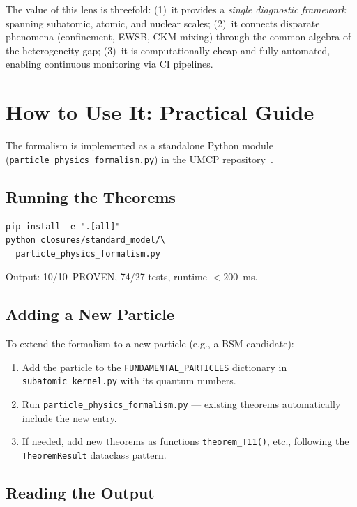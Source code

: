 \documentclass[
  aps,
  prd,
  twocolumn,
  superscriptaddress,
  nofootinbib,
  floatfix
]{revtex4-2}
\begin{document}
The value of this lens is threefold:
(1)~it provides a \emph{single diagnostic framework} spanning
subatomic, atomic, and nuclear scales;
(2)~it connects disparate phenomena (confinement, EWSB, CKM mixing)
through the common algebra of the heterogeneity gap;
(3)~it is computationally cheap and fully automated, enabling
continuous monitoring via CI pipelines.

\section{How to Use It: Practical Guide}\label{sec:howto}

The formalism is implemented as a standalone Python module
(\texttt{particle\_physics\_formalism.py}) in the UMCP
repository~\cite{umcpmetadatarepo}.

\subsection{Running the Theorems}

\begin{verbatim}
pip install -e ".[all]"
python closures/standard_model/\
  particle_physics_formalism.py
\end{verbatim}

Output: 10/10~PROVEN, 74/27 tests, runtime $< 200$~ms.

\subsection{Adding a New Particle}

To extend the formalism to a new particle (e.g., a BSM candidate):

\begin{enumerate}
\item Add the particle to the \texttt{FUNDAMENTAL\_PARTICLES}
  dictionary in \texttt{subatomic\_kernel.py} with its
  quantum numbers.
\item Run \texttt{particle\_physics\_formalism.py} ---
  existing theorems automatically include the new entry.
\item If needed, add new theorems as functions
  \texttt{theorem\_T11()}, etc., following the
  \texttt{TheoremResult} dataclass pattern.
\end{enumerate}

\subsection{Reading the Output}
\end{document}
